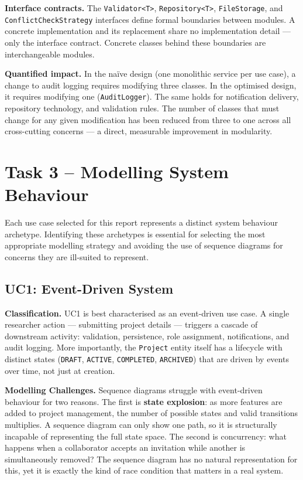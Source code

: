 \documentclass[12pt,a4paper]{article}
\newcommand{\code}[1]{\texttt{\small #1}}
\begin{document}
\noindent\textbf{Interface contracts.} The \code{Validator<T>}, \code{Repository<T>}, \code{FileStorage}, and \code{ConflictCheckStrategy} interfaces define formal boundaries between modules. A concrete implementation and its replacement share no implementation detail --- only the interface contract. Concrete classes behind these boundaries are interchangeable modules.

\noindent\textbf{Quantified impact.} In the na\"{i}ve design (one monolithic service per use case), a change to audit logging requires modifying three classes. In the optimised design, it requires modifying one (\code{AuditLogger}). The same holds for notification delivery, repository technology, and validation rules. The number of classes that must change for any given modification has been reduced from three to one across all cross-cutting concerns --- a direct, measurable improvement in modularity.

\section{Task 3 -- Modelling System Behaviour}

Each use case selected for this report represents a distinct system behaviour archetype. Identifying these archetypes is essential for selecting the most appropriate modelling strategy and avoiding the use of sequence diagrams for concerns they are ill-suited to represent.

\subsection{UC1: Event-Driven System}

\noindent\textbf{Classification.}
UC1 is best characterised as an event-driven use case. A single researcher action --- submitting project details --- triggers a cascade of downstream activity: validation, persistence, role assignment, notifications, and audit logging. More importantly, the \code{Project} entity itself has a lifecycle with distinct states (\code{DRAFT}, \code{ACTIVE}, \code{COMPLETED}, \code{ARCHIVED}) that are driven by events over time, not just at creation.

\noindent\textbf{Modelling Challenges.}
Sequence diagrams struggle with event-driven behaviour for two reasons. The first is \textbf{state explosion}: as more features are added to project management, the number of possible states and valid transitions multiplies. A sequence diagram can only show one path, so it is structurally incapable of representing the full state space. The second is concurrency: what happens when a collaborator accepts an invitation while another is simultaneously removed? The sequence diagram has no natural representation for this, yet it is exactly the kind of race condition that matters in a real system.
\end{document}

